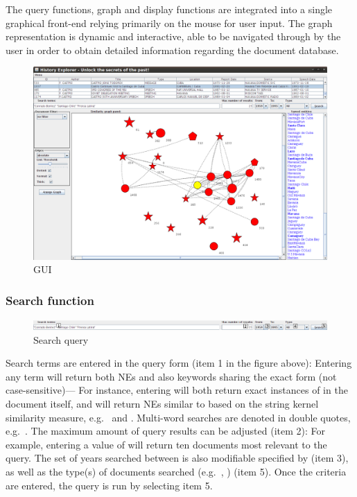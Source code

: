 The query functions, graph and display functions are integrated into a single graphical front-end relying primarily on the mouse for user input. The graph representation is dynamic and interactive, able to be navigated through by the user in order to obtain detailed information regarding the document database.

\begin{figure}[h]
\centering
\caption{GUI}
\includegraphics[width=160mm]{gui.png}
\end{figure}

\subsubsection{Search function}
\begin{figure}[h]
\centering
\caption{Search query}
\includegraphics[width=160mm]{search.png}
\end{figure}

Search terms are entered in the query form (item 1 in the figure above): Entering any term will return both NEs and also keywords sharing the exact form (not case-sensitive)--- For instance, entering  will both return exact instances of  in the document itself, and will return NEs similar to  based on the string kernel similarity measure, e.g.\  and . Multi-word searches are denoted in double quotes, e.g.\ . The maximum amount of query results can be adjusted (item 2): For example, entering a value of  will return ten documents most relevant to the query. The set of years searched between is also modifiable specified by (item 3), as well as the type(s) of documents searched (e.g.\ , ) (item 5). Once the criteria are entered, the query is run by selecting item 5.

